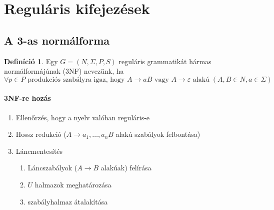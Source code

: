 \documentclass[a4paper,12pt]{article}
\theoremstyle{definition}
\newtheorem*{definition*}{Definíció}
\begin{document}
\section{Reguláris kifejezések}

\subsection{A 3-as normálforma}
\begin{definition*}
	Egy $ G = (N, \Sigma, P, S) $ reguláris grammatikát hármas normálformájúnak (3NF) nevezünk, ha
	\[
	\forall p \in P \text{ produkciós szabályra igaz, hogy } A \rightarrow aB \text{ vagy } A \rightarrow \varepsilon \text{ alakú} \; \left( A,B \in N, a \in \Sigma \right) 
	\]
\end{definition*}
\paragraph{3NF-re hozás}
\begin{enumerate}
	\item Ellenőrzés, hogy a nyelv valóban reguláris-e
	\item Hossz redukció ($ A \rightarrow a_1,\dots,a_nB $ alakú szabályok felbontása)
	\item Láncmentesítés
	\begin{enumerate}
		\item Láncszabályok ($ A \rightarrow B $ alakúak) felírása
		\item $U$ halmazok meghatározása
		\item szabályhalmaz átalakítása
	\end{enumerate}
\end{enumerate}
\end{document}
